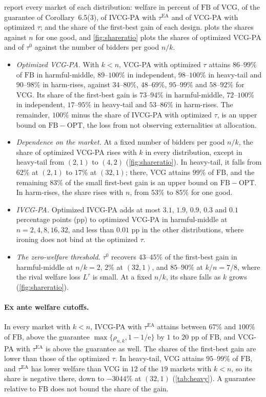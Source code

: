 \documentclass[11pt]{article}
\newcommand{\FB}{\mathrm{FB}}
\newcommand{\tauea}{\tau^{\mathrm{EA}}}
\newcommand{\eul}{\mathrm{e}}
\newcommand{\OPT}{\mathrm{OPT}}
\begin{document}
 report every market of each distribution: welfare in percent of $\FB$ of VCG, of the guarantee of Corollary~6.5(3), of IVCG-PA with $\tauea$ and of VCG-PA with optimized $\tau$; and the share of the first-best gain of each design.  plots the shares against $n$ for one good, and \cref{fig:shareratio} plots the shares of optimized VCG-PA and of $\tau^0$ against the number of bidders per good $n/k$.

\begin{itemize}
    \item \emph{Optimized VCG-PA.} With $k<n$, VCG-PA with optimized $\tau$ attains $86$--$99\%$ of $\FB$ in harmful-middle, $89$--$100\%$ in independent, $98$--$100\%$ in heavy-tail and $90$--$98\%$ in harm-rises, against $34$--$80\%$, $48$--$69\%$, $95$--$99\%$ and $58$--$92\%$ for VCG. Its share of the first-best gain is $73$--$94\%$ in harmful-middle, $72$--$100\%$ in independent, $17$--$95\%$ in heavy-tail and $53$--$86\%$ in harm-rises. The remainder, $100\%$ minus the share of IVCG-PA with optimized $\tau$, is an upper bound on $\FB-\OPT$, the loss from not observing externalities at allocation.
    \item \emph{Dependence on the market.} At a fixed number of bidders per good $n/k$, the share of optimized VCG-PA rises with $k$ in every distribution, except in heavy-tail from $(2,1)$ to $(4,2)$ (\cref{fig:shareratio}). In heavy-tail, it falls from $62\%$ at $(2,1)$ to $17\%$ at $(32,1)$; there, VCG attains $99\%$ of $\FB$, and the remaining $83\%$ of the small first-best gain is an upper bound on $\FB-\OPT$. In harm-rises, the share rises with $n$, from $53\%$ to $85\%$ for one good.
    \item \emph{IVCG-PA.} Optimized IVCG-PA adds at most $3.1$, $1.9$, $0.9$, $0.3$ and $0.1$ percentage points (pp) to optimized VCG-PA in harmful-middle at $n=2,4,8,16,32$, and less than $0.01$ pp in the other distributions, where ironing does not bind at the optimized $\tau$.
    \item \emph{The zero-welfare threshold.} $\tau^0$ recovers $43$--$45\%$ of the first-best gain in harmful-middle at $n/k=2$, $2\%$ at $(32,1)$, and $85$--$90\%$ at $k/n=7/8$, where the rival welfare loss $L^\tau$ is small. At a fixed $n/k$, its share falls as $k$ grows (\cref{fig:shareratio}).
\end{itemize}

\paragraph{Ex ante welfare cutoffs.} In every market with $k<n$, IVCG-PA with $\tauea$ attains between $67\%$ and $100\%$ of $\FB$, above the guarantee $\max\{\rho_{n,k},1-1/\eul\}$ by $1$ to $20$ pp of $\FB$, and VCG-PA with $\tauea$ is above the guarantee as well. The shares of the first-best gain are lower than those of the optimized $\tau$. In heavy-tail, VCG attains $95$--$99\%$ of $\FB$, and $\tauea$ has lower welfare than VCG in $12$ of the $19$ markets with $k<n$, so its share is negative there, down to $-3044\%$ at $(32,1)$ (\cref{tab:heavy}). A guarantee relative to $\FB$ does not bound the share of the gain.
\end{document}
